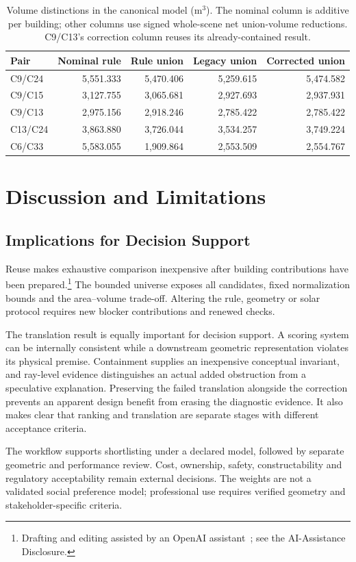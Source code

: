 \documentclass{llncs}
\newcommand{\aidraft}{\footnote{Drafting and editing assisted by an OpenAI assistant~\cite{openai2026}; see the AI-Assistance Disclosure.}}
\begin{document}
\begin{table}[tbp]
\caption{Volume distinctions in the canonical model (m$^3$). The nominal column is additive per building; other columns use signed whole-scene net union-volume reductions. C9/C13's correction column reuses its already-contained result.}
\label{tab:volumes}\centering
\begin{tabular}{lrrrr}\toprule
Pair & Nominal rule & Rule union & Legacy union & Corrected union\\\midrule
C9/C24 & 5,551.333 & 5,470.406 & 5,259.615 & 5,474.582\\
C9/C15 & 3,127.755 & 3,065.681 & 2,927.693 & 2,937.931\\
C9/C13 & 2,975.156 & 2,918.246 & 2,785.422 & 2,785.422\\
C13/C24 & 3,863.880 & 3,726.044 & 3,534.257 & 3,749.224\\
C6/C33 & 5,583.055 & 1,909.864 & 2,553.509 & 2,554.767\\\bottomrule
\end{tabular}
\end{table}

\FloatBarrier
\section{Discussion and Limitations}
\subsection{Implications for Decision Support}
Reuse makes exhaustive comparison inexpensive after building contributions have been prepared.\aidraft{} The bounded universe exposes all candidates, fixed normalization bounds and the area--volume trade-off. Altering the rule, geometry or solar protocol requires new blocker contributions and renewed checks.

The translation result is equally important for decision support. A scoring system can be internally consistent while a downstream geometric representation violates its physical premise. Containment supplies an inexpensive conceptual invariant, and ray-level evidence distinguishes an actual added obstruction from a speculative explanation. Preserving the failed translation alongside the correction prevents an apparent design benefit from erasing the diagnostic evidence. It also makes clear that ranking and translation are separate stages with different acceptance criteria.

The workflow supports shortlisting under a declared model, followed by separate geometric and performance review. Cost, ownership, safety, constructability and regulatory acceptability remain external decisions. The weights are not a validated social preference model; professional use requires verified geometry and stakeholder-specific criteria.
\end{document}
